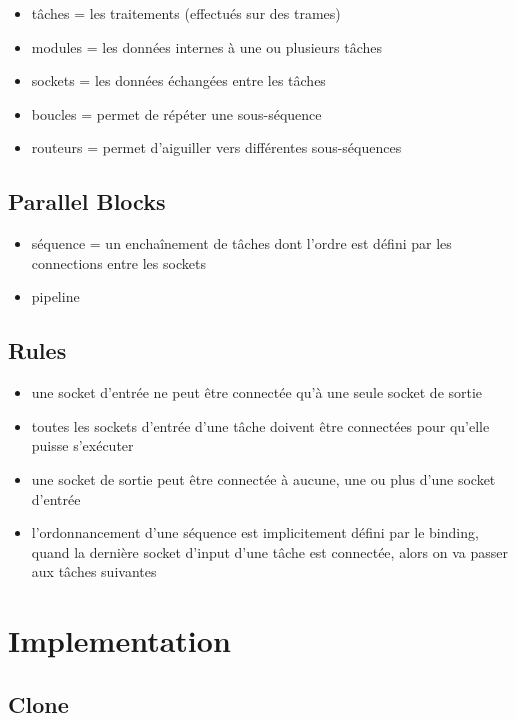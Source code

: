 \begin{itemize}
  \item tâches = les traitements (effectués sur des trames)
  \item modules = les données internes à une ou plusieurs tâches
  \item sockets = les données échangées entre les tâches
  \item boucles = permet de répéter une sous-séquence
  \item routeurs = permet d'aiguiller vers différentes sous-séquences
\end{itemize}

\subsection{Parallel Blocks}

\begin{itemize}
  \item séquence = un enchaînement de tâches dont l'ordre est défini par les
        connections entre les sockets
  \item pipeline
\end{itemize}

\subsection{Rules}

\begin{itemize}
  \item une socket d'entrée ne peut être connectée qu'à une seule socket de
        sortie
  \item toutes les sockets d'entrée d'une tâche doivent être connectées pour
        qu'elle puisse s'exécuter
  \item une socket de sortie peut être connectée à aucune, une ou plus d'une
        socket d'entrée
  \item l'ordonnancement d'une séquence est implicitement défini par le binding,
        quand la dernière socket d'input d'une tâche est connectée, alors on va
        passer aux tâches suivantes
\end{itemize}

\section{Implementation}

\subsection{Clone}

